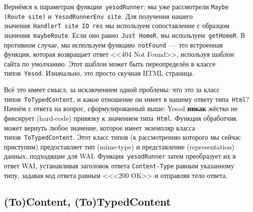 Вернёмся к параметрам функции~\lstinline'yesodRunner': мы уже рассмотрели
\lstinline'Maybe (Route site)' и~\lstinline'YesodRunnerEnv site'. Для получения
нашего значения~\lstinline'HandlerT site IO res' мы используем сопоставление с
образцом значения~\lstinline'maybeRoute'. Если оно равно~\lstinline'Just HomeR',
мы используем~\lstinline'getHomeR'. В противном случае, мы используем
функцию~\lstinline'notFound'~--- это встроенная функция, которая возвращает
ответ <<404 Not Found>>, используя шаблон сайта по умолчанию. Этот шаблон может
быть переопределён в классе типов~\lstinline'Yesod'. Изначально, это просто
скучная HTML страница.

Всё это имеет смысл, за исключением одной проблемы: что это за класс
типов~\lstinline'ToTypedContent', и какое отношение он имеет в нашему ответу
типа~\lstinline'Html'? Начнём с ответа на вопрос, сформулированный выше: Yesod
\textbf{никак} жёстко не фиксирует (hard-code) привязку к значением
типа~\lstinline'Html'. Функция обработчик может вернуть любое значение, которое
имеет экземпляр класса типов~\lstinline'ToTypedContent'. Этот класс типов
(к рассмотрению которого мы сейчас приступим) предоставляет тип (mime-type) и
представление (representation) данных, подходящие для WAI.
Функция~\lstinline'yesodRunner' затем преобразует их в ответ WAI, устанавливая
заголовок ответа \texttt{Content-Type} равным указанному типу, задавая код ответа
равным <<<200 OK>> и отправляя тело ответа.

\subsection{(To)Content, (To)TypedContent}
